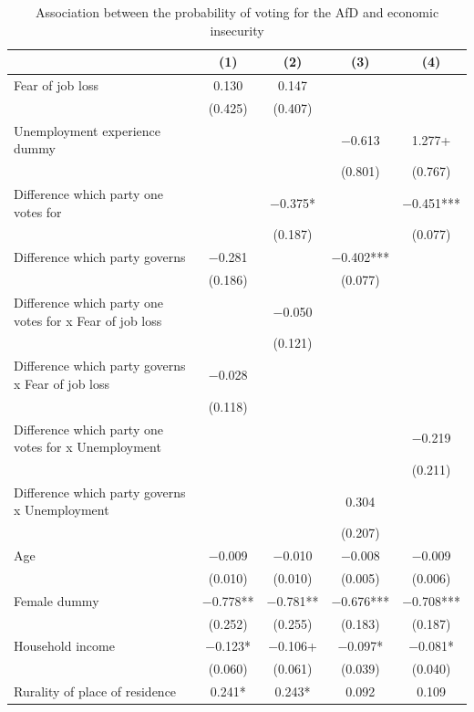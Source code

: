 \documentclass[
]{article}
\begin{document}
\begin{table}[!h]

\caption{\label{tab:regression-results-1-table1}Association between the probability of voting for the AfD and economic insecurity}
\centering
\begin{tabular}[t]{lcccc}
\toprule
  & (1) & (2) & (3) & (4)\\
\midrule
Fear of job loss & \num{0.130} & \num{0.147} &  & \\
 & (\num{0.425}) & (\num{0.407}) &  & \\
Unemployment experience dummy &  &  & \num{-0.613} & \num{1.277}+\\
 &  &  & (\num{0.801}) & (\num{0.767})\\
Difference which party one votes for &  & \num{-0.375}* &  & \num{-0.451}***\\
 &  & (\num{0.187}) &  & (\num{0.077})\\
Difference which party governs & \num{-0.281} &  & \num{-0.402}*** & \\
 & (\num{0.186}) &  & (\num{0.077}) & \\
Difference which party one votes for
x Fear of job loss &  & \num{-0.050} &  & \\
 &  & (\num{0.121}) &  & \\
Difference which party governs
x Fear of job loss & \num{-0.028} &  &  & \\
 & (\num{0.118}) &  &  & \\
Difference which party one votes for
x Unemployment &  &  &  & \num{-0.219}\\
 &  &  &  & (\num{0.211})\\
Difference which party governs
x Unemployment &  &  & \num{0.304} & \\
 &  &  & (\num{0.207}) & \\
Age & \num{-0.009} & \num{-0.010} & \num{-0.008} & \num{-0.009}\\
 & (\num{0.010}) & (\num{0.010}) & (\num{0.005}) & (\num{0.006})\\
Female dummy & \num{-0.778}** & \num{-0.781}** & \num{-0.676}*** & \num{-0.708}***\\
 & (\num{0.252}) & (\num{0.255}) & (\num{0.183}) & (\num{0.187})\\
Household income & \num{-0.123}* & \num{-0.106}+ & \num{-0.097}* & \num{-0.081}*\\
 & (\num{0.060}) & (\num{0.061}) & (\num{0.039}) & (\num{0.040})\\
Rurality of place
of residence & \num{0.241}* & \num{0.243}* & \num{0.092} & \num{0.109}\\

\end{tabular}
\end{table}
\end{document}
